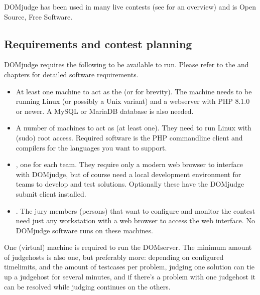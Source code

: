 \documentclass[a4paper,10pt,english,openany]{sphinxmanual}
\begin{document}
\sphinxAtStartPar
DOMjudge has been used in many live contests
(see  for an overview) and
is Open Source, Free Software.


\subsection{Requirements and contest planning}
\label{\detokenize{overview:requirements-and-contest-planning}}
\sphinxAtStartPar
DOMjudge requires the following to be available to run. Please refer to the
{\hyperref[\detokenize{install-domserver::doc}]{}} and {\hyperref[\detokenize{install-judgehost::doc}]{}}
chapters for detailed software requirements.
\begin{itemize}
\item {} 
\sphinxAtStartPar
At least one machine to act as the  (or  for
brevity). The machine needs to be running Linux (or possibly a Unix
variant) and a webserver with PHP 8.1.0 or newer. A MySQL or MariaDB
database is also needed.

\item {} 
\sphinxAtStartPar
A number of machines to act as  (at least one). They need to run
Linux with (sudo) root access. Required software is the PHP commandline
client and compilers for the languages you want to support.

\item {} 
\sphinxAtStartPar
{}, one for each team. They require only a modern
web browser to interface with DOMjudge, but of course need a local
development environment for teams to develop and test solutions. Optionally
these have the DOMjudge submit client installed.

\item {} 
\sphinxAtStartPar
{}. The jury members (persons) that want to
configure and monitor the contest need just any workstation with a web
browser to access the web interface. No DOMjudge software runs on these
machines.

\end{itemize}

\sphinxAtStartPar
One (virtual) machine is required to run the DOMserver. The minimum amount of
judgehosts is also one, but preferably more: depending on configured timelimits,
and the amount of testcases per problem, judging one solution can tie up a
judgehost for several minutes, and if there’s a problem with one judgehost it
can be resolved while judging continues on the others.
\end{document}
